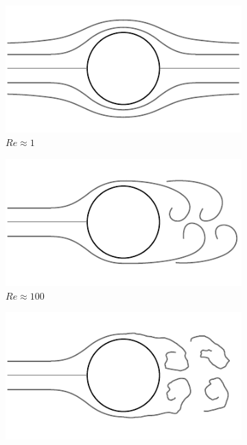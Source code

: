 \begin{figure}[htbp]
	\centering
	\begin{subfigure}[b]{0.40\textwidth}
		\includegraphics[width=\linewidth]{Pictures/ch7_cylinder_1}
		\caption{$Re\approx1$}
	\end{subfigure}
	\begin{subfigure}[b]{0.40\textwidth}
		\includegraphics[width=\linewidth]{Pictures/ch7_cylinder_2}
		\caption{$Re\approx100$}
	\end{subfigure}
	\begin{subfigure}[b]{0.40\textwidth}
		\includegraphics[width=\linewidth]{Pictures/ch7_cylinder_3}

\end{subfigure}
\end{figure}
